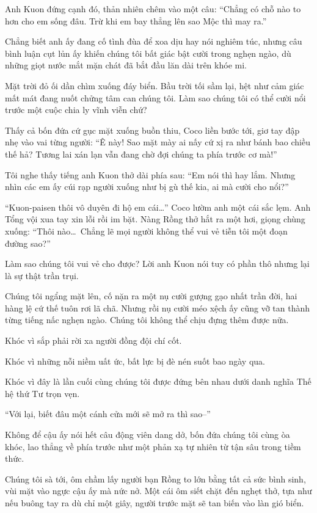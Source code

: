 \documentclass[../main.tex]{subfiles}
\begin{document}
Anh Kuon đứng cạnh đó, thản nhiên chêm vào một câu: ``Chẳng có chỗ nào to hơn cho em sống đâu. Trừ khi em bay thẳng lên sao Mộc thì may ra.''

Chẳng biết anh ấy đang cố tình đùa để xoa dịu hay nói nghiêm túc, nhưng câu bình luận cụt lủn ấy khiến chúng tôi bất giác bật cười trong nghẹn ngào, dù những giọt nước mắt mặn chát đã bắt đầu lăn dài trên khóe mi.

Mặt trời đỏ ối dần chìm xuống đáy biển. Bầu trời tối sầm lại, hệt như cảm giác mất mát đang nuốt chửng tâm can chúng tôi. Làm sao chúng tôi có thể cười nổi trước một cuộc chia ly vĩnh viễn chứ?

Thấy cả bốn đứa cứ gục mặt xuống buồn thiu, Coco liền bước tới, giơ tay đập nhẹ vào vai từng người: ``Ê này! Sao mặt mày ai nấy cứ xị ra như bánh bao chiều thế hả? Tương lai xán lạn vẫn đang chờ đợi chúng ta phía trước cơ mà!''

Tôi nghe thấy tiếng anh Kuon thở dài phía sau: ``Em nói thì hay lắm. Nhưng nhìn các em ấy cúi rạp người xuống như bị gù thế kia, ai mà cười cho nổi?''

``Kuon-paisen thôi vô duyên đi hộ em cái\dots'' Coco lườm anh một cái sắc lẹm. Anh Tổng vội xua tay xin lỗi rồi im bặt. Nàng Rồng thở hắt ra một hơi, giọng chùng xuống: ``Thôi nào\dots\ Chẳng lẽ mọi người không thể vui vẻ tiễn tôi một đoạn đường sao?''

Làm sao chúng tôi vui vẻ cho được? Lời anh Kuon nói tuy có phần thô nhưng lại là sự thật trần trụi.

Chúng tôi ngẩng mặt lên, cố nặn ra một nụ cười gượng gạo nhất trần đời, hai hàng lệ cứ thế tuôn rơi lã chã. Nhưng rồi nụ cười méo xệch ấy cũng vỡ tan thành từng tiếng nấc nghẹn ngào. Chúng tôi không thể chịu đựng thêm được nữa.

Khóc vì sắp phải rời xa người đồng đội chí cốt.

Khóc vì những nỗi niềm uất ức, bất lực bị đè nén suốt bao ngày qua.

Khóc vì đây là lần cuối cùng chúng tôi được đứng bên nhau dưới danh nghĩa Thế hệ thứ Tư trọn vẹn.

``Với lại, biết đâu một cánh cửa mới sẽ mở ra thì sao--''

Không để cậu ấy nói hết câu động viên dang dở, bốn đứa chúng tôi cùng òa khóc, lao thẳng về phía trước như một phản xạ tự nhiên từ tận sâu trong tiềm thức.

Chúng tôi sà tới, ôm chầm lấy người bạn Rồng to lớn bằng tất cả sức bình sinh, vùi mặt vào ngực cậu ấy mà nức nở. Một cái ôm siết chặt đến nghẹt thở, tựa như nếu buông tay ra dù chỉ một giây, người trước mặt sẽ tan biến vào làn gió biển.
\end{document}
